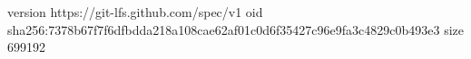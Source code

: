 version https://git-lfs.github.com/spec/v1
oid sha256:7378b67f7f6dfbdda218a108cae62af01c0d6f35427c96e9fa3c4829c0b493e3
size 699192
